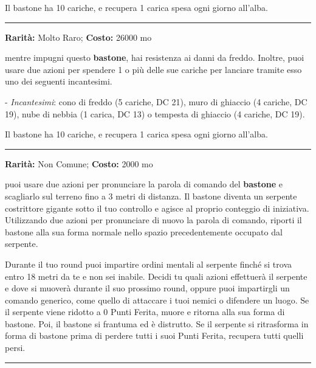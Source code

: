 \begin{multicols}{2}
Il bastone ha 10 cariche, e recupera 1 carica spesa ogni giorno all'alba.

\smallskip\noindent\rule{\linewidth}{2pt}  \hypertarget{BastonedelGelo}{}\smallskip{}\noindent\label{BastonedelGelo}

\textbf{Rarità:} Molto Raro; \textbf{Costo:} 26000 mo

mentre impugni questo \textbf{bastone}, hai resistenza ai danni da freddo.
Inoltre, puoi usare due azioni per spendere 1 o più delle sue cariche per lanciare tramite esso uno dei seguenti incantesimi.

- \emph{Incantesimi}: cono di freddo (5 cariche, DC 21), muro di ghiaccio (4 cariche, DC 19), nube di nebbia (1 carica, DC 13) o tempesta di ghiaccio (4 cariche, DC 19).

Il bastone ha 10 cariche, e recupera 1 carica spesa ogni giorno all'alba.

\smallskip\noindent\rule{\linewidth}{2pt}  \hypertarget{BastonedelPitone}{}\smallskip{}\noindent\label{BastonedelPitone}

\textbf{Rarità:} Non Comune; \textbf{Costo:} 2000 mo

puoi usare due azioni per pronunciare la parola di comando del \textbf{bastone} e scagliarlo sul terreno fino a 3 metri di distanza. Il bastone diventa un serpente costrittore gigante sotto il tuo controllo e agisce al proprio conteggio di iniziativa. Utilizzando due azioni per pronunciare di nuovo la parola di comando, riporti il bastone alla sua forma normale nello spazio precedentemente occupato dal serpente.

Durante il tuo round puoi impartire ordini mentali al serpente finché si trova entro 18 metri da te e non sei inabile. Decidi tu quali azioni effettuerà il serpente e dove si muoverà durante il suo prossimo round, oppure puoi impartirgli un comando generico, come quello di attaccare i tuoi nemici o difendere un luogo. Se il serpente viene ridotto a 0 Punti Ferita, muore e ritorna alla sua forma di bastone. Poi, il bastone si frantuma ed è distrutto. Se il serpente si ritrasforma in forma di bastone prima di perdere tutti i suoi Punti Ferita, recupera tutti quelli persi.

\smallskip\noindent\rule{\linewidth}{2pt}  \hypertarget{BastonedelPotere}{}\smallskip{}\noindent\label{BastonedelPotere}


\end{multicols}
